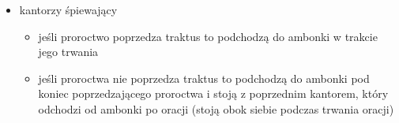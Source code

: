 \begin{itemize}
	\item kantorzy śpiewający
	      \begin{itemize}
		      \item jeśli proroctwo poprzedza traktus to podchodzą do ambonki w
		            trakcie jego trwania
		      \item jeśli proroctwa nie poprzedza traktus to podchodzą do
		            ambonki pod koniec poprzedzającego proroctwa i stoją z
		            poprzednim kantorem, który odchodzi od ambonki po oracji
		            (stoją obok siebie podczas trwania oracji)
	      \end{itemize}
\end{itemize}
